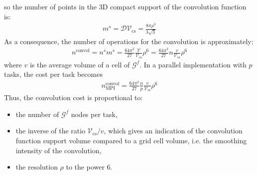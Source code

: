 \documentclass[12pt]{scrartcl}
\begin{document}
so the number of points in the 3D compact support of the convolution function is:
\begin{align}
m^s = \mathcal{D} \mathcal{V}_\mathrm{cs} = \frac{8\pi \rho^3}{3\sqrt{3}}
\end{align}
As a consequence, the number of operations for the convolution is approximately:
\begin{align}
n^\mathrm{convol} = n^s m^s = \frac{64\pi^2}{27} \frac{\mathcal{V}}{\mathcal{V}_\mathrm{cs}} \rho^6 = \frac{64\pi^2}{27} n \frac{v}{\mathcal{V}_\mathrm{cs}} \rho^6
\end{align}
where $v$ is the average volume of a cell of $\mathcal{G}^f$. In a parallel implementation with $p$ tasks, the cost per task becomes
\begin{align}
n^\mathrm{convol}_\mathrm{MPI} = \frac{64\pi^2}{27} \frac{n}{p} \frac{v}{\mathcal{V}_\mathrm{cs}} \rho^6
\end{align}
Thus, the convolution cost is proportional to:
\begin{itemize}
\item the number of $\mathcal{G}^f$ nodes per task,
\item the inverse of the ratio $\mathcal{V}_\mathrm{cs}/v$, which gives an indication of the convolution function support volume compared to a grid cell volume, i.e. the smoothing intensity of the convolution,
\item the resolution $\rho$ to the power 6.
\end{itemize}
\end{document}
